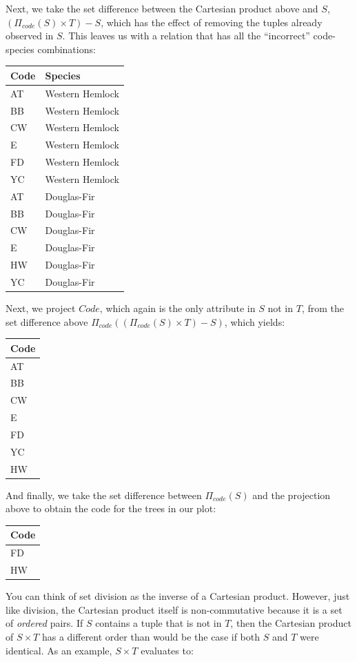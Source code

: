 \documentclass[
]{book}
\begin{document}
Next, we take the set difference between the Cartesian product above and \(S\), \((Π_{code}(S)×T)-S\), which has the effect of removing the tuples already observed in \(S\). This leaves us with a relation that has all the ``incorrect'' code-species combinations:

\begin{tabular}{ll}
\toprule
Code & Species\\
\midrule
AT & Western Hemlock\\
BB & Western Hemlock\\
CW & Western Hemlock\\
E & Western Hemlock\\
FD & Western Hemlock\\
\addlinespace
YC & Western Hemlock\\
AT & Douglas-Fir\\
BB & Douglas-Fir\\
CW & Douglas-Fir\\
E & Douglas-Fir\\
\addlinespace
HW & Douglas-Fir\\
YC & Douglas-Fir\\
\bottomrule
\end{tabular}

Next, we project \(Code\), which again is the only attribute in \(S\) not in \(T\), from the set difference above \(Π_{code}((Π_{code}(S) × T) - S)\), which yields:

\begin{tabular}{l}
\toprule
Code\\
\midrule
AT\\
BB\\
CW\\
E\\
FD\\
\addlinespace
YC\\
HW\\
\bottomrule
\end{tabular}

And finally, we take the set difference between \(Π_{code}(S)\) and the projection above to obtain the code for the trees in our plot:

\begin{tabular}{l}
\toprule
Code\\
\midrule
FD\\
HW\\
\bottomrule
\end{tabular}

You can think of set division as the inverse of a Cartesian product. However, just like division, the Cartesian product itself is non-commutative because it is a set of \emph{ordered} pairs. If \(S\) contains a tuple that is not in \(T\), then the Cartesian product of \(S×T\) has a different order than would be the case if both \(S\) and \(T\) were identical. As an example, \(S×T\) evaluates to:
\end{document}
